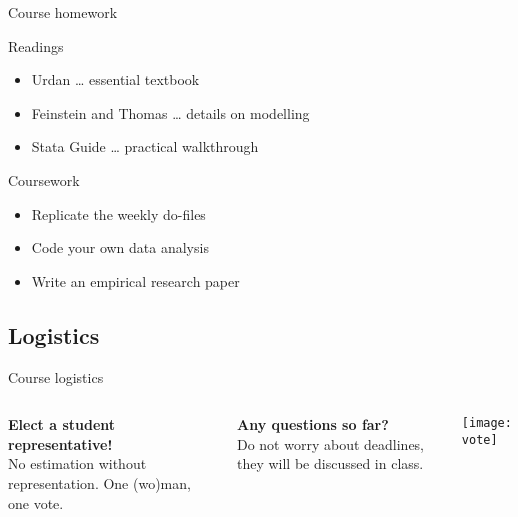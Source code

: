 \documentclass[t]{beamer}
\begin{document}
  \begin{frame}[t]{Course homework}

    
    \begin{block}{Readings}
      \begin{itemize}
        \item Urdan 								\hfill … essential textbook
        \item Feinstein and Thomas  \hfill … details on modelling
        \item Stata Guide           \hfill … practical walkthrough
      \end{itemize} 
    \end{block}
  
    \begin{block}{Coursework}
      \begin{itemize}
              \item Replicate the weekly do-files
              \item Code your own data analysis
          \item Write an empirical research paper
      \end{itemize} 
    \end{block}
    
  \end{frame}
  
  \subsection{Logistics}
	
  \begin{frame}[t]{Course logistics}

    \begin{columns}[T]

      
        \textbf{Elect a student representative!}\\[1em]

        No estimation without representation. One (wo)man, one vote.\vspace{1em}
      
        \textbf{Any questions so far?}\\[1em]
      
        Do not worry about deadlines, they will be discussed in class.


        \texttt{[image: vote]}

    \end{columns}   

  \end{frame}
  
\end{document}
